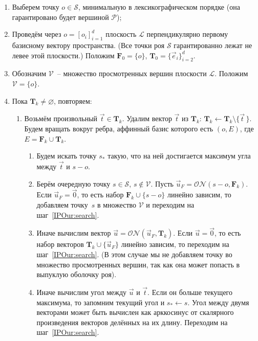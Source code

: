 \documentclass[a4paper,12pt]{article}
\newcommand{\Swarm}{\mathcal{S}}              %
\newcommand{\Polytop}{\mathcal{P}}         %
\newcommand{\Viewed}{\mathcal{V}}             %
\newcommand{\ZVec}{\vec 0}                    %
\newcommand{\set}[2][]{#1\{ #2 #1\}}                    %
\newcommand{\ONorm}[3][]{\mathcal{ON}#1( #2, #3 #1)} %
\newcommand{\TempVec}{\mathbf{T}}  %
\newcommand{\FinalVec}{\mathbf{F}} %
\newcommand{\Plane}{\mathcal{L}}           %
\renewcommand{\.}{\hspace{0.2ex}}
\begin{document}
    \begin{enumerate}
      \item Выберем точку $o \in \Swarm$, минимальную в лексикографическом порядке (она гарантировано будет вершиной $\Polytop$);


      \item Проведём через $o=[o_i]_{i = 1}^{d}$ плоскость $\Plane$ перпендикулярно первому базисному вектору пространства. (Все точки роя $\Swarm$ гарантированно лежат не левее этой плоскости.) Положим $\FinalVec_0 = \set{o}$, $\TempVec_0 = \set{\vec e_i}_{i=2}^d$.


      \item Обозначим $\Viewed$~-- множество просмотренных вершин плоскости $\Plane$. Положим $\Viewed =\set{o}$.


      \item Пока $\TempVec_k \neq \varnothing$, повторяем:


      \begin{enumerate}
        \item Возьмём произвольный $\vec t \in \TempVec_k$. Удалим вектор $\vec t$ из $\TempVec_k$: $\TempVec_k \leftarrow \TempVec_k \setminus \set{\vec t \,}$. Будем вращать вокруг ребра, аффинный базис которого есть $(o, E)$, где $E = \FinalVec_k \cup \TempVec_k$.


        \begin{enumerate}
          \item Будем искать точку $s_*$ такую, что на ней достигается максимум угла между $\vec t$ и $s - o$.


          \item Берём очередную точку $s \in \Swarm$, $s \notin \Viewed$. Пусть $\vec u_F = \ONorm{s - o}{\FinalVec_k}$. Если $\vec u_F = \ZVec$, то есть набор $\FinalVec_k \cup \set{s - o}$ линейно зависим, то добавляем точку~$s$ в множество $\Viewed$ и переходим на шаг~\ref{IPOur:search}.
          \label{IPOur:search}


          \item Иначе вычислим вектор $\vec u = \ONorm{\vec u_F}{\TempVec_k}$. Если $\vec u = \ZVec$, то есть набор векторов $\TempVec_k \cup \set{\vec u_F}$ линейно зависим, то переходим на шаг~\ref{IPOur:search}. (В этом случае мы не добавляем точку во множество просмотренных вершин, так как она может попасть в выпуклую оболочку роя).


          \item Иначе вычислим угол между $\vec u$ и $\vec t$. Если он больше текущего максимума, то запомним текущий угол и $s_* \leftarrow s$. Угол между двумя векторами может быть вычислен как арккосинус от скалярного произведения векторов делённых на их длину. Переходим на шаг~\ref{IPOur:search}.
        \end{enumerate}



\end{enumerate}
\end{enumerate}
\end{document}
